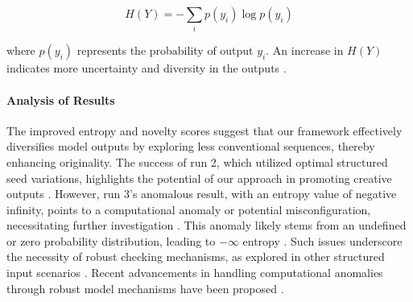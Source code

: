 \documentclass{article} %
\begin{document}
\begin{equation}
H(Y) = - \sum_{i} p(y_i) \log p(y_i)
\end{equation}


where $p(y_i)$ represents the probability of output $y_i$. An increase in $H(Y)$ indicates more uncertainty and diversity in the outputs \cite{maximum2010}.


\begin{table}[h]
\centering

\label{tab:results}
\caption{Comparison of entropy and novelty scores across different runs using structured seed-conditioning.}
\end{table}



\paragraph{Analysis of Results} The improved entropy and novelty scores suggest that our framework effectively diversifies model outputs by exploring less conventional sequences, thereby enhancing originality. The success of run 2, which utilized optimal structured seed variations, highlights the potential of our approach in promoting creative outputs \cite{measuring2025,generative2024}. However, run 3's anomalous result, with an entropy value of negative infinity, points to a computational anomaly or potential misconfiguration, necessitating further investigation \cite{large2024}. This anomaly likely stems from an undefined or zero probability distribution, leading to $-\infty$ entropy \cite{creating2012}. Such issues underscore the necessity of robust checking mechanisms, as explored in other structured input scenarios \cite{cottontail2025}. Recent advancements in handling computational anomalies through robust model mechanisms have been proposed \cite{investigating2025}.
\end{document}
